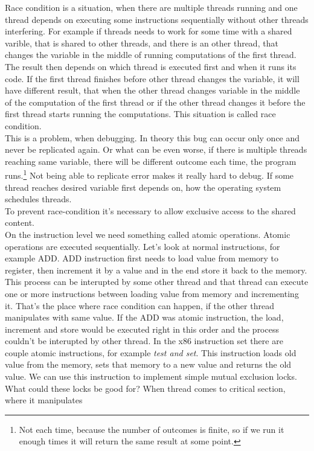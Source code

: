 \documentclass[a4paper]{article}
\begin{document}
Race condition is a situation, when there are multiple threads running and one thread
depends on executing some instructions sequentially without other threads interfering.
For example if threads needs to work for some time with a shared varible, that is 
shared to other threads, and there is an other thread, that changes the variable in
the middle of running computations of the first thread. The result then depends on which
thread is executed first and when it runs its code. If the first thread finishes before
other thread changes the variable, it will have different result, that when the other thread
changes variable in the middle of the computation of the first thread  or if the
other thread changes it before the first thread starts running the computations. This
situation is called race condition.\\
This is a problem, when debugging. In theory this bug can occur only once and never be replicated
again. Or what can be even worse, if there is multiple threads reaching same variable,
there will be different outcome each time, the program runs.\footnote{Not 
each time, because the number of outcomes is finite, so if we run it enough times
it will return the same result at some point.}
Not being able to replicate error makes it really hard to debug. If some thread 
reaches desired variable first depends on, how the operating system schedules threads. \\
To prevent race-condition it's necessary to allow exclusive access to the shared content. \\
On the instruction level we need something called atomic operations. Atomic operations are
executed sequentially. Let's look at normal instructions, for example ADD. ADD instruction 
first needs to load value from memory to register, then increment it by a value and in the 
end store it back to the memory. This process can be interupted by some other thread and 
that thread can execute one or more instructions between loading value from memory and 
incrementing it. That's the place where race condition can happen, if the other thread
manipulates with same value. If the ADD was atomic instruction, the load, increment and store
would be executed right in this order and the process couldn't be interupted by other thread.
In the x86 instruction set there are couple atomic instructions, for example \textit{test and
set}. This instruction loads old value from the memory, sets that memory to a new value and
returns the old value. We can use this instruction to implement simple mutual exclusion locks.
What could these locks be good for? When thread comes to critical section, where it manipulates
\end{document}
